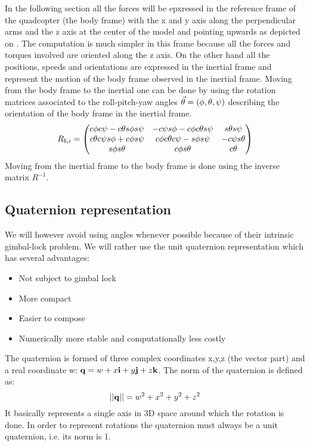 In the following section all the forces will be epxressed in the reference frame
of the quadcopter (the body frame) with the x and y axis along the perpendicular
arms and the z axis at the center of the model and pointing upwards as depicted
on . The computation is much simpler in this frame because all the
forces and torques involved are oriented along the z axis. On the other hand all
the positions, speeds and orientations are expressed in the inertial frame and
represent the motion of the body frame observed in the inertial frame. Moving
from the body frame to the inertial one can be done by using the rotation
matrices associated to the roll-pitch-yaw angles $\vec{\theta} =
(\phi,\theta,\psi)$ describing the orientation of the body frame in the inertial frame.
\begin{equation}
	R_{b,i} = \begin{pmatrix}
	c\phi c\psi - c\theta s\phi s\psi & -c\psi s\phi - c\phi c\theta s\psi &
	s\theta s\psi\\
	c\theta c\psi s\phi+c\phi s\psi & c\phi c\theta c\psi-s\phi s\psi &
	-c\psi s\theta\\
	s\phi s\theta & c\phi s\theta & c\theta
	\end{pmatrix}
\end{equation}
Moving from the inertial frame to the body frame is done using the inverse
matrix $R^{-1}$.

\subsection{Quaternion representation}
We will however avoid using angles whenever possible because of their intrinsic
gimbal-lock problem. We will rather use the
unit quaternion representation which has several advantages:
\begin{itemize}
  \item Not subject to gimbal lock
  \item More compact
  \item Easier to compose
  \item Numerically more stable and computationally less costly
\end{itemize}
The quaternion is formed of three complex coordinates x,y,z (the
vector part) and a real coordinate w: $\mathbf{q} = w + x\mathbf{i} + y\mathbf{j} +
z\mathbf{k}$. The norm of the quaternion is defined as:
\begin{equation}
	||\mathbf{q}|| = w^2 + x^2 + y^2 + z^2
\end{equation}
It basically represents a
single axis in 3D space around which the rotation is done. In order to represent rotations the quaternion must
always be a unit quaternion, i.e. its norm is 1.

